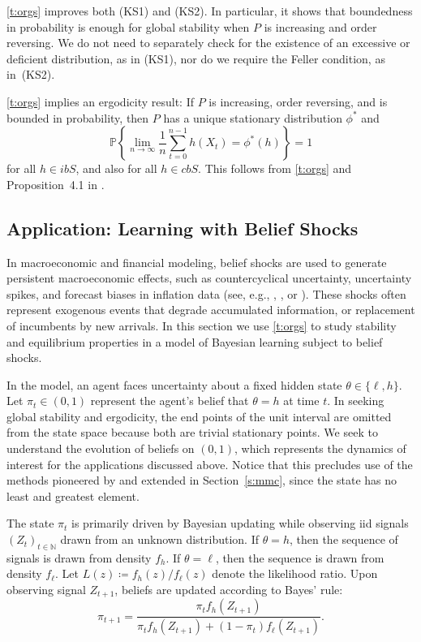 \documentclass[12pt,reqno]{amsart}
\numberwithin{equation}{section}
\theoremstyle{definition}
\newcommand{\1}{\mathbbm{1}}
\newcommand{\NN}{\mathbb{N}}
\newcommand{\PP}{\mathbb P}
\begin{document}
\cref{t:orgs} improves both (KS1) and (KS2).  In particular, it
shows that boundedness in probability is enough for global stability when $P$ is
increasing and order reversing. We do not need to separately check for the
existence of an excessive or deficient distribution, as in (KS1), nor do we
require the Feller condition, as in~(KS2).


\cref{t:orgs} implies an ergodicity result:
If $P$ is increasing, order reversing, and is bounded in probability,
then $P$ has a unique stationary distribution $\phi^*$ 
and
%
\begin{equation*}
    \PP
    \left\{
         \lim_{n \to \infty}
         \frac{1}{n} \sum_{t=0}^{n-1} h(X_t) = \phi^*(h)
    \right\} = 1
\end{equation*}
%
for all $h \in ibS$, and also for all $h \in cbS$.
This follows from \cref{t:orgs} and Proposition~4.1 in \cite{kamihigashi2016seeking}.


\subsection{Application: Learning with Belief Shocks}\label{ss:bshock}

In macroeconomic and financial modeling, belief shocks are used to generate
persistent macroeconomic effects, such as countercyclical uncertainty,
uncertainty spikes, and forecast biases in inflation data
(see, e.g., \cite{orlik2014understanding},
\cite{cogley2008drifting}, or \cite{suda2010beliefs}). These shocks often
represent exogenous events that degrade accumulated information, or 
replacement of incumbents by new arrivals.  In this section we use
\cref{t:orgs} to study stability and
equilibrium properties in a model of Bayesian learning subject to belief shocks.

In the model, an agent faces uncertainty about
a fixed hidden state $\theta \in \{\ell, h\}$.  Let
$\pi_t \in (0,1)$ represent the agent's belief that $\theta = h$ at time
$t$. In seeking global stability and ergodicity, the end points of the unit
interval are omitted from the state space because both are trivial stationary
points.  We seek to understand the evolution of beliefs on $(0,1)$, which
represents the dynamics of interest for the applications discussed above. Notice
that this precludes use of the methods pioneered by \cite{hopenhayn1992stochastic} and
extended in Section~\ref{s:mmc}, since the state has no least and greatest
element.

The state $\pi_t$ is primarily driven by Bayesian updating while observing
{\sc iid} signals $(Z_t)_{t \in \NN}$ drawn from an unknown distribution. If
$\theta = h$, then the sequence of signals is drawn from density $f_h$.  If
$\theta = \ell$, then the sequence is drawn from density $f_\ell$.
Let $L(z) \coloneq f_h(z)/f_\ell(z)$ denote the likelihood ratio.
Upon observing signal $Z_{t+1}$, beliefs are updated according to Bayes' rule: 
%
\begin{equation}
    \pi_{t+1} 
     = \frac{\pi_t f_h(Z_{t+1})}{\pi_t f_h(Z_{t+1}) + (1-\pi_t)
     f_\ell(Z_{t+1})}.
\end{equation}
%
\end{document}
